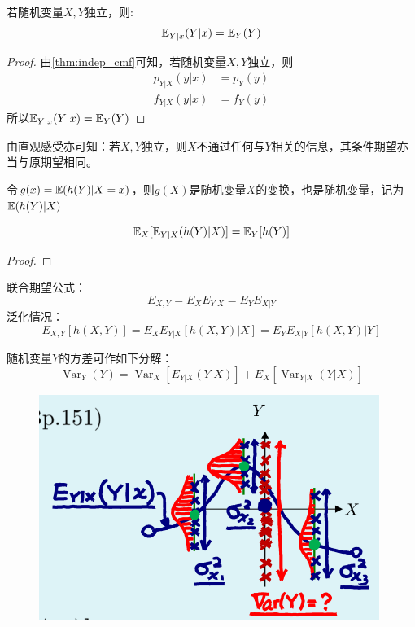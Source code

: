 \begin{theorem}
    若随机变量$X,Y$独立，则:
    \[ \mathbb{E}_{Y|x}(Y|x)=\mathbb{E}_{Y}(Y) \]
\end{theorem}

\begin{proof}
    由\ref{thm:indep_cmf}可知，若随机变量$X,Y$独立，则
    \begin{align*}
        p_{Y|X}(y|x) & =p_{Y}(y) \\
        f_{Y|X}(y|x) & =f_{Y}(y)
    \end{align*}
    所以$\mathbb{E}_{Y|x}(Y|x)=\mathbb{E}_{Y}(Y)$
\end{proof}

由直观感受亦可知：若$X,Y$独立，则$X$不通过任何与$Y$相关的信息，其条件期望亦当与原期望相同。

\begin{note}
    令$g(x)=\mathbb{E}(h(Y)|X=x)$，则$g(X)$是随机变量$X$的变换，也是随机变量，记为$\mathbb{E}(h(Y)|X)$
\end{note}

\begin{theorem}[重期望公式]
    \[ \mathbb{E}_X[\mathbb{E}_{Y|X}(h(Y)|X)] = \mathbb{E}_{Y}[h(Y)] \]
\end{theorem}

\begin{proof}
\end{proof}

\begin{theorem}
    联合期望公式：
    \[ E_{X,Y}=E_X E_{Y|X} = E_Y E_{X|Y} \]
    泛化情况：
    \[ E_{X,Y}[h(X,Y)]=E_X E_{Y|X}[h(X,Y)|X] = E_Y E_{X|Y}[h(X,Y)|Y] \]
\end{theorem}

\begin{theorem}[重方差公式]\label{thm:var_dec}
    随机变量$Y$的方差可作如下分解：
    \[ \operatorname{Var}_Y(Y)=\operatorname{Var}_X[E_{Y|X}(Y|X)] + E_X[\operatorname{Var}_{Y|X}(Y|X)] \]
\end{theorem}

\begin{figure}
    \centering
    \includegraphics{image/var_dec.png}
\end{figure}

